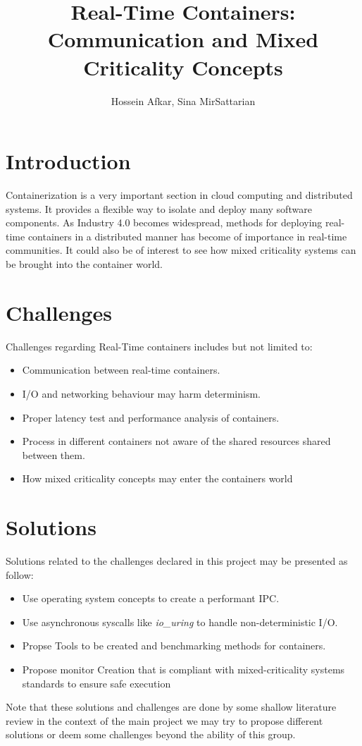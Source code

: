 \documentclass[a4paper, 11pt]{article}
\title{Real-Time Containers: Communication and Mixed Criticality Concepts}
\author{Hossein Afkar, Sina MirSattarian}
\theoremstyle{nonumberplain}
\begin{document}
\maketitle

\section{Introduction}
Containerization is a very important section in cloud computing and distributed
systems. It provides a flexible way to isolate and deploy many software
components. As Industry 4.0 becomes widespread, methods for deploying real-time
containers in a distributed manner has become of importance in real-time
communities. It could also be of interest to see how mixed criticality
systems can be brought into the container world.

\section{Challenges}
Challenges regarding Real-Time containers includes but not limited to:
\begin{itemize}
    \item Communication between real-time containers.
    \item I/O and networking behaviour may harm determinism.
    \item Proper latency test and performance analysis of containers.
    \item Process in different containers not aware of the shared resources
        shared between them.
    \item How mixed criticality concepts may enter the containers world
\end{itemize}

\section{Solutions}
Solutions related to the challenges declared in this project may be presented
as follow:
\begin{itemize}
    \item Use operating system concepts to create a performant IPC.
    \item Use asynchronous syscalls like \textit{io\_uring} to handle
        non-deterministic I/O.
    \item Propse Tools to be created and benchmarking methods for containers.
    \item Propose monitor Creation that is compliant with mixed-criticality
        systems standards to ensure safe execution
\end{itemize}
Note that these solutions and challenges are done by some shallow literature
review in the context of the main project we may try to propose different
solutions or deem some challenges beyond the ability of this group.
% 
\end{document}
